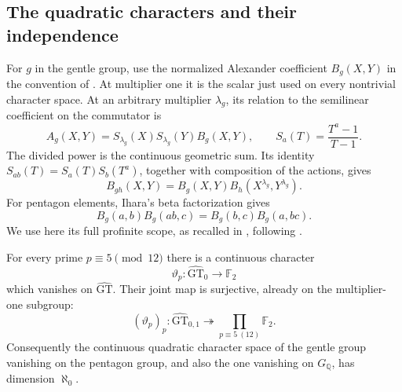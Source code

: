 \subsection{The quadratic characters and their independence}

For $g$ in the gentle group, use the normalized Alexander coefficient
$B_g(X,Y)$ in the convention of \cite[\S2.3, p.~101]{Furusho2003}.
At multiplier one it is the scalar just used on every nontrivial
character space. At an arbitrary multiplier $\lambda_g$, its relation
to the semilinear coefficient on the commutator is
\[
 A_g(X,Y)=S_{\lambda_g}(X)S_{\lambda_g}(Y)B_g(X,Y),
 \qquad S_a(T)=\frac{T^a-1}{T-1}.
\]
The divided power is the continuous geometric sum. Its identity
$S_{ab}(T)=S_a(T)S_b(T^a)$, together with composition of the
actions, gives
\begin{equation}
 B_{gh}(X,Y)=B_g(X,Y)
                  B_h(X^{\lambda_g},Y^{\lambda_g}).
 \label{eq:beta-crossed-law}
\end{equation}
For pentagon elements, Ihara's beta factorization gives
\begin{equation}
 B_g(a,b)B_g(ab,c)=B_g(b,c)B_g(a,bc).
 \label{eq:beta-associativity}
\end{equation}
We use here its full profinite scope, as recalled in
\cite[\S2.3, p.~101]{Furusho2003}, following
\cite[Proposition~1.6.1]{Ihara1999}.

\begin{theorem}\label{thm:quadratic-beta-family}
For every prime $p\equiv5\pmod{12}$ there is a continuous character
\[
 \vartheta_p:\widehat{\mathrm{GT}}_0\longrightarrow\mathbb F_2
\]
which vanishes on $\widehat{\mathrm{GT}}$. Their joint map is
surjective, already on the multiplier-one subgroup:
\[
 (\vartheta_p)_p:
 \widehat{\mathrm{GT}}_{0,1}
      \twoheadrightarrow\prod_{p\equiv5\ (12)}\mathbb F_2.
\]
Consequently the continuous quadratic character space of the gentle
group vanishing on the pentagon group, and also the one vanishing on
$G_{\mathbb Q}$, has dimension $\aleph_0$.
\end{theorem}

